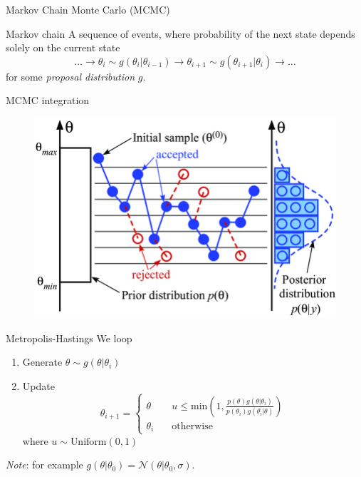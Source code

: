 \documentclass[
aspectratio=169,
14pt,
professionalfonts
]{beamer}
\begin{document}
\begin{frame}
\center
\Large
Markov Chain Monte Carlo (MCMC)
\end{frame}

\begin{frame}{Markov chain}
    A sequence of events, where probability of the next state depends solely on the current state
    $$
    \ldots \to \theta_{i} \sim g(\theta_{i} | \theta_{i-1}) \to \theta_{i+1} \sim g(\theta_{i+1} | \theta_{i}) \to \ldots
    $$
    for some \textit{proposal distribution} $g$. 
\end{frame}
\begin{frame}{MCMC integration}
    \begin{figure}
        \centering
        \includegraphics[width=0.6\linewidth]{../plots/mcmc_diagram.png}
    \end{figure}
\end{frame}

\begin{frame}{Metropolis-Hastings}
We loop
\begin{enumerate}
    \item Generate $\theta \sim g(\theta|\theta_i)$
    \item Update
    \begin{equation*}
        \theta_{i+1} =
        \begin{cases}
            \theta  &\quad u \leq \text{min}\left(1, \frac{p(\theta)g(\theta|\theta_i)}{p(\theta_i)g(\theta_i|\theta)}\right)\\
            \theta_i &\quad \text{otherwise}
        \end{cases}
    \end{equation*}
    where $u \sim \text{Uniform}(0, 1)$
\end{enumerate}
\textit{Note}: for example $g(\theta|\theta_0) = \mathcal{N}(\theta|\theta_0, \sigma)$.
\end{frame}
\end{document}

